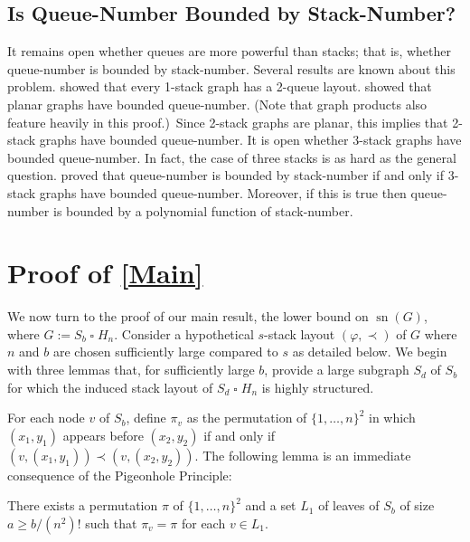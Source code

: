 \documentclass[kpfonts]{patmorin}
\DeclareMathOperator{\sn}{sn}
\renewcommand{\ge}{\geqslant}
\newcommand{\CartProd}{\mathbin{\square}}
\begin{document}

\subsection*{Is Queue-Number Bounded by Stack-Number? }

It remains open whether queues are more powerful than stacks; that is, whether queue-number is bounded by stack-number. Several results are known about this problem. \citet{HLR92} showed that every 1-stack graph has a 2-queue layout. \citet{DJMMUW20} showed that planar graphs have bounded queue-number. (Note that graph products also feature heavily in this proof.)\ Since 2-stack graphs are planar, this implies that 2-stack graphs have bounded queue-number. It is open whether 3-stack graphs have bounded queue-number. In fact, the case of three stacks is as hard as the general question. \citet{DujWoo05} proved that queue-number is bounded by stack-number if and only if 3-stack graphs have bounded queue-number. Moreover, if this is true then queue-number is bounded by a polynomial function of stack-number.



\section{Proof of \cref{Main}}

We now turn to the proof of our main result, the lower bound on $\sn(G)$, where $G:= S_b\CartProd H_n$. Consider a hypothetical $s$-stack layout $(\varphi,\prec)$ of $G$ where $n$ and $b$ are chosen sufficiently large compared to $s$ as detailed below. We begin with three lemmas that, for sufficiently large $b$, provide a large subgraph $S_d$ of $S_b$ for which the induced stack layout of $S_d\CartProd H_n$ is highly structured.

For each node $v$ of $S_b$, define $\pi_v$ as the permutation of $\{1,\ldots,n\}^2$ in which $(x_1,y_1)$ appears before $(x_2,y_2)$ if and only if $(v,(x_1,y_1))\prec (v,(x_2,y_2))$. The following lemma is an immediate consequence of the Pigeonhole Principle:

\begin{lem}\label{uniform_order}
    There exists a permutation $\pi$ of $\{1,\ldots,n\}^2$ and a set $L_1$ of leaves of $S_b$ of size $a\ge b/(n^2)!$ such that $\pi_{v}=\pi$ for each $v\in L_1$.
\end{lem}
\end{document}
